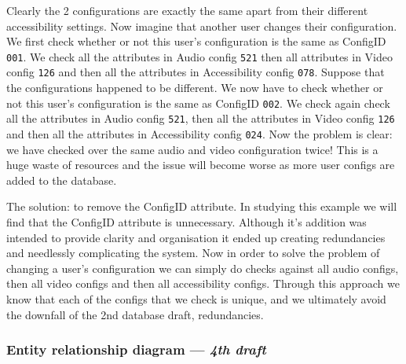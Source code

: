 Clearly the 2 configurations are exactly the same apart from 
their different accessibility settings. Now imagine that 
another user changes their configuration. We first check 
whether or not this user's configuration is the same as
ConfigID \texttt{001}. We check all the attributes in Audio
config \texttt{521} then all attributes in Video config
\texttt{126} and then all the attributes in Accessibility config
\texttt{078}. Suppose that the configurations happened to be 
different. We now have to check whether or not this user's 
configuration is the same as ConfigID \texttt{002}. We check 
again check all the attributes in Audio config \texttt{521},
then all the attributes in Video config \texttt{126} and then
all the attributes in Accessibility config \texttt{024}. Now 
the problem is clear: we have checked over the same audio and 
video configuration twice! This is a huge waste of resources and 
the issue will become worse as more user configs are added to 
the database. \\ \vspace{0.2cm}

The solution: to remove the ConfigID attribute. In studying this 
example we will find that the ConfigID attribute is unnecessary.
Although it's addition was intended to provide clarity and
organisation it ended up creating redundancies and needlessly
complicating the system. Now in order to solve the problem of 
changing a user's configuration we can simply do checks against
all audio configs, then all video configs and then all
accessibility configs. Through this approach we know that each 
of the configs that we check is unique, and we ultimately avoid 
the downfall of the 2nd database draft, redundancies. 

\subsubsection{Entity relationship diagram — \textit{4th draft}}

